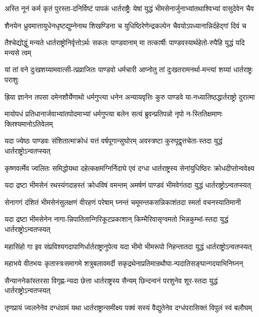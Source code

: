 \twolineshloka
{अस्ति नूनं कर्म कृतं पुरस्ता-दनिर्विष्टं पापकं धार्तराष्ट्रैः}
{येषां युद्धं भीमसेनार्जुनाभ्यांतथाश्विभ्यां वासुदेवेन चैव}


\twolineshloka
{शैनयेन ध्रुवमात्तायुधेनधृष्टद्युम्नेनाथ शिखण्डिना च}
{युधिष्ठिरेणेन्द्रकल्पेन चैवयोऽपध्यानान्निर्दहेद्गां दिवं च}


\twolineshloka
{तैश्चेद्योद्धुं मन्यते धार्तराष्ट्रोनिर्वृत्तोऽर्थः सकलः पाण्डवानाम्}
{मा तत्कार्षीः पाण्डवस्यार्थहेतो-रुपैहि युद्धं यदि मन्यसे त्वम्}


\twolineshloka
{यां तां वने दुःखशय्यामवात्सी-त्प्रव्राजितः पाण्डवो धर्मचारी}
{आप्नोतु तां दुःखतरामनर्था-मन्त्यां शय्यां धार्तराष्ट्रः पराशुः}


\twolineshloka
{ह्रिया ज्ञानेन तपसा दमेनशौर्येणाथो धर्मगुप्त्या धनेन}
{अन्यायवृत्तिः कुरु पाण्डवे या-नध्यातिष्ठद्धार्तराष्ट्रो दुरात्मा}


\twolineshloka
{मायोपधं प्रतिधानार्जवाभ्यांतपोदमाभ्यां धर्मगुप्त्या बलेन}
{सत्यं ब्रुवन्प्रतिपन्नो नृपो न-स्तितिक्षमाणः क्लिश्यमानोऽतिवेलम्}


\twolineshloka
{यदा ज्येष्ठः पाण्डवः संशितात्माक्रोधं यत्तं वर्षपूगान्सुघोरम्}
{अवस्त्रष्टा कुरुपूद्वृत्तचेता-स्तदा युद्धं धार्तराष्ट्रोऽन्वतप्स्यत्}


\twolineshloka
{कृष्णवर्त्मेव ज्वलितः समिद्धोयथा दहेत्कक्षमग्निर्निदाघे}
{एवं दग्धा धार्तराष्ट्रस्य सेनांयुधिष्ठिरः क्रोधदीप्तोन्ववेक्ष्य}


\twolineshloka
{यदा द्रष्टा भीमसेनं रथस्यंगदाहस्तं क्रोधविषं वमन्तम्}
{अमर्षणं पाण्डवं भीमवेगंतदा युद्धं धार्तराष्ट्रोऽन्वतप्स्यत्}


\twolineshloka
{सेनागगं दंशितं भीमसेनंसुलक्षणं वीरहणं परेषाम्}
{घ्नन्तं चमूमन्तकसन्निकाशंतदा स्मर्ता वचनस्यातिमानी}


\twolineshloka
{यदा द्रष्टा भीमसेनेन नागा-न्निपातितान्गिरिकूटप्रकाशान्}
{किम्भैरिवासृग्वमतो भिन्नकुम्भां-स्तदा युद्धं धार्तराष्ट्रोऽन्वतप्स्यत्}


\twolineshloka
{महासिंहो गा इव संप्रविश्यगदापाणिर्धार्तराष्ट्रानुपेत्य}
{यदा भीमो भीमरूपो निहन्तातदा युद्धं धार्तराष्ट्रोऽन्वतप्स्यत्}


\twolineshloka
{महाभये वीतभयः कृतास्त्रःसमागमे शत्रुबलावमर्दी}
{सकृद्रथेनाप्रतिमान्रथौघा-न्पदातिसङ्घान्गदयाभिनिघ्नन्}


\twolineshloka
{सैन्याननेकांस्तरसा विगृह्ण-न्यदा छेत्ता धार्तराष्ट्रस्य सैन्यम्}
{छिन्दन्वनं परशुनेव शूर-स्तदा युद्धं धार्तराष्ट्रोऽन्वतप्स्यत्}


\twolineshloka
{तृणप्रायं ज्वलनेनेव दग्धंग्रामं यथा धार्तराष्ट्रान्समीक्ष्य}
{पक्वं सस्यं वैद्युतेनेव दग्धंपरासिक्तं विपुलं स्वं बलौघम्}


